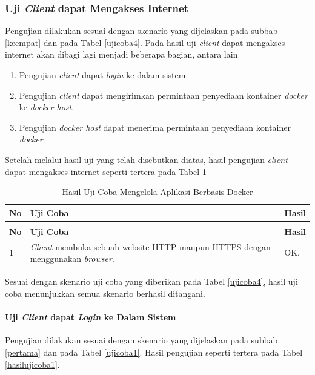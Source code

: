 \subsubsection{Uji \textit{Client} dapat Mengakses Internet}
Pengujian dilakukan sesuai dengan skenario yang dijelaskan pada subbab \ref{keempat} dan pada Tabel \ref{ujicoba4}. Pada hasil uji \textit{client} dapat mengakses internet akan dibagi lagi menjadi beberapa bagian, antara lain
\begin{enumerate}
\item Pengujian \textit{client} dapat \textit{login} ke dalam sistem.
\item Pengujian \textit{client} dapat mengirimkan permintaan penyediaan kontainer \textit{docker} ke \textit{docker host}.
\item Pengujian \textit{docker host} dapat menerima permintaan penyediaan kontainer \textit{docker}.
\end{enumerate}

Setelah melalui hasil uji yang telah disebutkan diatas, hasil pengujian \textit{client} dapat mengakses internet seperti tertera pada Tabel \ref{hasilujicoba5}

\begin{longtable}{|p{}|p{}|p{}|}					\caption{Hasil Uji Coba \textit{Client} dapat Mengakses Internet} \label{hasilujicoba5} \\
	\hline
	\textbf{No} & \textbf{Uji Coba} & \textbf{Hasil} \\ \hline
	\endfirsthead
	\caption[]{Hasil Uji Coba Mengelola Aplikasi Berbasis Docker} \\
	\hline
	\textbf{No} & \textbf{Uji Coba} & \textbf{Hasil} \\ \hline
	\endhead
	\endfoot
	\endlastfoot
	
	1 & \textit{Client} membuka sebuah website HTTP maupun HTTPS dengan menggunakan \textit{browser}. & OK. \\ \hline
\end{longtable}
Sesuai dengan skenario uji coba  yang diberikan pada Tabel \ref{ujicoba4}, hasil uji coba menunjukkan semua skenario berhasil ditangani.


\paragraph{Uji \textit{Client} dapat \textit{Login} ke Dalam Sistem}
Pengujian dilakukan sesuai dengan skenario yang dijelaskan pada subbab \ref{pertama} dan pada Tabel \ref{ujicoba1}. Hasil pengujian seperti tertera pada Tabel \ref{hasilujicoba1}.
        
